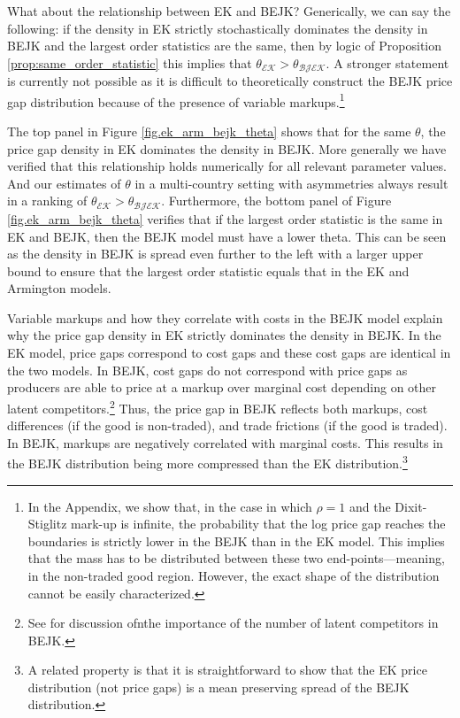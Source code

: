 \documentclass[12pt,dvips, ps2pdf]{article}
\begin{document}
What about the relationship between EK and BEJK? Generically, we can say the following: if the density in EK strictly stochastically dominates the density in BEJK and the largest order statistics are the same, then by logic of Proposition \ref{prop:same_order_statistic} this implies that $\theta_{\mathcal{EK}} > \theta_{\mathcal{BJEK}}$. A stronger statement is currently not possible as it is difficult to theoretically construct the BEJK price gap distribution because of the presence of variable markups.\footnote{In the Appendix, we show that, in the case in which $\rho=1$ and the Dixit-Stiglitz mark-up is infinite, the probability that the log price gap reaches the boundaries is strictly lower in the BEJK than in the EK model. This implies that the mass has to be distributed between these two end-points---meaning, in the non-traded good region. However, the exact shape of the distribution cannot be easily characterized.}

The top panel in Figure \ref{fig.ek_arm_bejk_theta} shows that for the same $\theta$, the price gap density in EK dominates the density in BEJK. More generally we have verified that this relationship holds numerically for all relevant parameter values. And our estimates of $\theta$ in a multi-country setting with asymmetries always result in a ranking of $\theta_{\mathcal{EK}} > \theta_{\mathcal{BJEK}}$. Furthermore, the bottom panel of Figure \ref{fig.ek_arm_bejk_theta} verifies that if the largest order statistic is the same in EK and BEJK, then the BEJK model must have a lower theta. This can be seen as the density in BEJK is spread even further to the left with a larger upper bound to ensure that the largest order statistic equals that in the EK and Armington models.

Variable markups and how they correlate with costs in the BEJK model explain why the price gap density in EK strictly dominates the density in BEJK. In the EK model, price gaps correspond to cost gaps and these cost gaps are identical in the two models. In BEJK, cost gaps do not correspond with price gaps as producers are able to price at a markup over marginal cost depending on other latent competitors.\footnote{See \citet{kadee} for discussion ofnthe importance of the number of latent competitors in BEJK.} Thus, the price gap in BEJK reflects both markups, cost differences (if the good is non-traded), and trade frictions (if the good is traded). In BEJK, markups are negatively correlated with marginal costs. This results in the BEJK distribution being more compressed than the EK distribution.\footnote{A related property is that it is straightforward to show that the EK price distribution (not price gaps) is a mean preserving spread of the BEJK distribution.}
\end{document}
